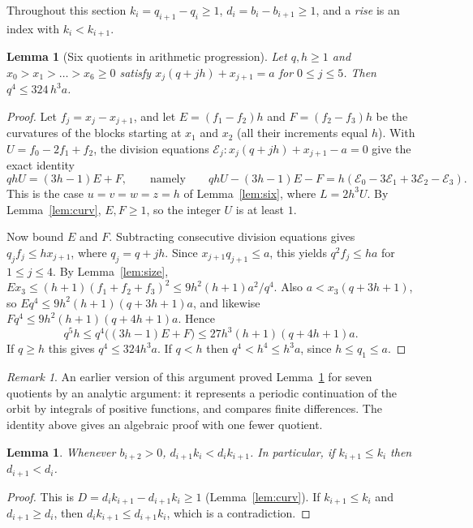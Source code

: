 \documentclass[11pt]{amsart}
\newtheorem{lemma}[theorem]{Lemma}
\theoremstyle{definition}
\theoremstyle{remark}
\newtheorem{remark}[theorem]{Remark}
\begin{document}
Throughout this section $k_i=q_{i+1}-q_i\ge1$, $d_i=b_i-b_{i+1}\ge1$, and a \emph{rise} is an
index with $k_i<k_{i+1}$.

\begin{lemma}[Six quotients in arithmetic progression]\label{lem:ap}
Let $q,h\ge1$ and $x_0>x_1>\dots>x_6\ge0$ satisfy $x_j(q+jh)+x_{j+1}=a$ for $0\le j\le5$. Then
$q^4\le 324\,h^3a$.
\end{lemma}

\begin{proof}
Let $f_j=x_j-x_{j+1}$, and let $E=(f_1-f_2)h$ and $F=(f_2-f_3)h$ be the curvatures of the blocks
starting at $x_1$ and $x_2$ (all their increments equal $h$). With $U=f_0-2f_1+f_2$, the
division equations $\mathcal E_j\colon x_j(q+jh)+x_{j+1}-a=0$ give the exact identity
\[
qhU=(3h-1)E+F,\qquad\text{namely}\qquad qhU-(3h-1)E-F=h(\mathcal E_0-3\mathcal E_1+3\mathcal E_2-\mathcal E_3).
\]
This is the case $u=v=w=z=h$ of Lemma~\ref{lem:six}, where $L=2h^3U$. By
Lemma~\ref{lem:curv}, $E,F\ge1$, so the integer $U$ is at least $1$.

Now bound $E$ and $F$. Subtracting consecutive division equations gives
$q_jf_j\le hx_{j+1}$, where $q_j=q+jh$. Since $x_{j+1}q_{j+1}\le a$, this yields
$q^2f_j\le ha$ for $1\le j\le4$. By Lemma~\ref{lem:size},
$Ex_3\le(h+1)(f_1+f_2+f_3)^2\le 9h^2(h+1)a^2/q^4$. Also $a<x_3(q+3h+1)$, so
$Eq^4\le 9h^2(h+1)(q+3h+1)a$, and likewise $Fq^4\le 9h^2(h+1)(q+4h+1)a$. Hence
\[
q^5h\le q^4\bigl((3h-1)E+F\bigr)\le 27h^3(h+1)(q+4h+1)a .
\]
If $q\ge h$ this gives $q^4\le 324h^3a$. If $q<h$ then $q^4<h^4\le h^3a$, since $h\le q_1\le a$.
\end{proof}

\begin{remark}
An earlier version of this argument proved Lemma~\ref{lem:ap} for seven quotients by an
analytic argument: it represents a periodic continuation of the orbit by integrals of
positive functions, and compares finite differences. The identity above gives an algebraic
proof with one fewer quotient.
\end{remark}

\begin{lemma}\label{lem:norise}
Whenever $b_{i+2}>0$, $d_{i+1}k_i<d_ik_{i+1}$. In particular, if $k_{i+1}\le k_i$ then
$d_{i+1}<d_i$.
\end{lemma}

\begin{proof}
This is $D=d_ik_{i+1}-d_{i+1}k_i\ge1$ (Lemma~\ref{lem:curv}). If $k_{i+1}\le k_i$ and
$d_{i+1}\ge d_i$, then $d_ik_{i+1}\le d_{i+1}k_i$, which is a contradiction.
\end{proof}
\end{document}
